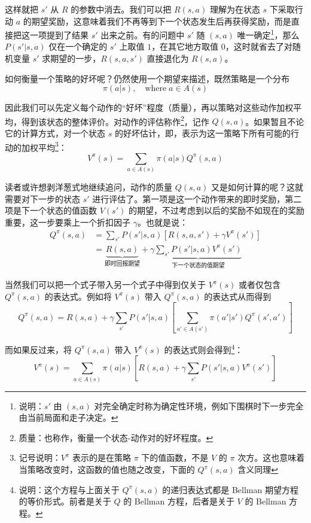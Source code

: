 这样就把 $s'$ 从 $R$ 的参数中消去。我们可以把 $R(s, a)$ 理解为在状态 $s$ 下采取行动 $a$ 的期望奖励，这意味着我们不再等到下一个状态发生后再获得奖励，而是直接把这一项提到了结果 $s'$ 出来之前。有的问题中 $s'$ 随 $(s, a)$ 唯一确定\footnote{说明：$s'$ 由 $(s, a)$ 对完全确定时称为确定性环境，例如下围棋时下一步完全由当前局面和走子决定。}，那么 $P(s' | s, a)$ 仅在一个确定的 $s'$ 上取值 $1$，在其它地方取值 $0$，这时就省去了对随机变量 $s'$ 求期望的一步，$R(s, a, s')$ 直接退化为 $R(s, a)$。

如何衡量一个策略的好坏呢？仍然使用一个期望来描述，既然策略是一个分布
\[
    \pi(a | s), \quad \text{where} \; a \in A(s)
\]

因此我们可以先定义每个动作的“好坏”程度（质量），再以策略对这些动作加权平均，得到该状态的整体评价。对动作的评估称作\footnote{质量：也称作，衡量一个状态-动作对的好坏程度。}，记作 $Q(s, a)$。如果暂且不论它的计算方式，对一个状态 $s$ 的好坏估计，即，表示为这一策略下所有可能的行动的加权平均\footnote{记号说明：$V^\pi$ 表示的是在策略 $\pi$ 下的值函数，不是 $V$ 的 $\pi$ 次方。这也意味着当策略改变时，这函数的值也随之改变，下面的 $Q^\pi (s, a)$ 含义同理}：
\[
    V^\pi (s) = \sum_{a \in A(s)} \pi(a | s) Q^\pi (s, a)
\]

读者或许想剥洋葱式地继续追问，动作的质量 $Q(s, a)$ 又是如何计算的呢？这就需要对下一步的状态 $s'$ 进行评估了。第一项是这一个动作带来的即时奖励，第二项是下一个状态的值函数 $V(s')$ 的期望，不过考虑到以后的奖励不如现在的奖励重要，这一步要乘上一个折扣因子 $\gamma$。也就是说：
\[
    \begin{aligned}
        Q^\pi (s, a) & =
        \sum_{s'} P(s' | s, a) \left[ R(s, a, s') + \gamma V^\pi (s') \right]                                                                                \\
                     & = \underset{\text{即时回报期望}}{\underbrace{R(s, a)}} + \gamma \underset{\text{下一个状态的值期望}}{\underbrace{\sum_{s'} P(s' | s, a) V^\pi (s')}}
    \end{aligned}
\]

当然我们可以把一个式子带入另一个式子中得到仅关于 $V^\pi (s)$ 或者仅包含 $Q^\pi (s, a)$ 的表达式。例如将 $V^\pi (s)$ 带入 $Q^\pi (s, a)$ 的表达式从而得到
\[
    Q^\pi (s, a) = R(s, a) + \gamma \sum_{s'} P(s' | s, a) \left[\sum_{a' \in A(s')} \pi(a' | s') Q^\pi (s', a')\right]
\]

而如果反过来，将 $Q^\pi (s, a)$ 带入 $V^\pi (s)$ 的表达式则会得到\footnote{说明：这个方程与上面关于 $Q^\pi (s, a)$ 的递归表达式都是 Bellman 期望方程的等价形式。前者是关于 $Q$ 的 Bellman 方程，后者是关于 $V$ 的 Bellman 方程。}：
\[
    V^\pi (s) = \sum_{a \in A(s)} \pi(a | s) \left[ R(s, a) + \gamma \sum_{s'} P(s' | s, a) V^\pi (s')\right]
\]

